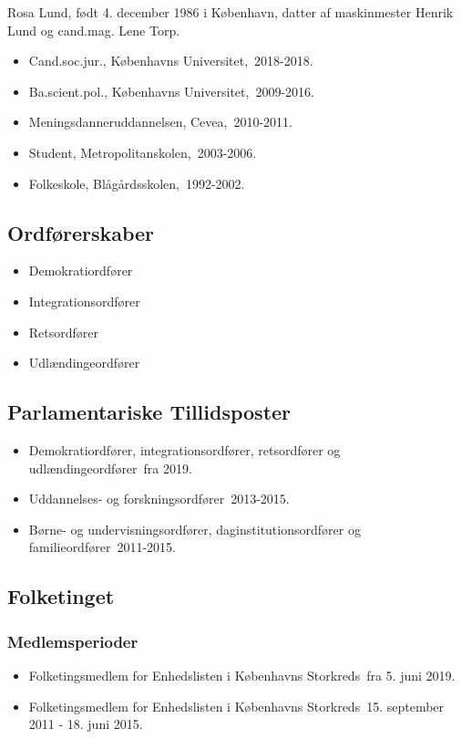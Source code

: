 \documentclass[11pt, a4paper]{awesome-cv}
\begin{document}
\makecvheader[R]
\makelettertitle
\begin{cvletter}
Rosa Lund, født 4. december 1986 i København, datter af maskinmester Henrik Lund og cand.mag. Lene Torp.

\begin{itemize}
\item Cand.soc.jur., Københavns Universitet, 2018-2018.
\item Ba.scient.pol., Københavns Universitet, 2009-2016.
\item Meningsdanneruddannelsen, Cevea, 2010-2011.
\item Student, Metropolitanskolen, 2003-2006.
\item Folkeskole, Blågårdsskolen, 1992-2002.
\end{itemize}
\subsection*{Ordførerskaber}
\begin{itemize}
\item Demokratiordfører
\item Integrationsordfører
\item Retsordfører
\item Udlændingeordfører
\end{itemize}
\subsection*{Parlamentariske Tillidsposter}
\begin{itemize}
\item Demokratiordfører, integrationsordfører, retsordfører og udlændingeordfører fra 2019.
\item Uddannelses- og forskningsordfører 2013-2015.
\item Børne- og undervisningsordfører, daginstitutionsordfører og familieordfører 2011-2015.
\end{itemize}
\subsection*{Folketinget}
\subsubsection*{Medlemsperioder}
\begin{itemize}
\item Folketingsmedlem for Enhedslisten i Københavns Storkreds fra 5. juni 2019.
\item Folketingsmedlem for Enhedslisten i Københavns Storkreds 15. september 2011 - 18. juni 2015.
\end{itemize}

\end{cvletter}
\end{document}
